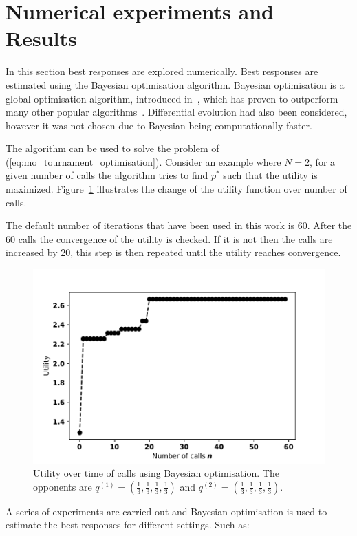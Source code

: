 \documentclass[10pt]{article}
\begin{document}
\section{Numerical experiments and Results} \label{section:numerical_experiments}

In this section best responses are explored numerically. Best responses are
estimated using the Bayesian optimisation algorithm. Bayesian optimisation is a
global optimisation algorithm, introduced in~\cite{Mokus1978}, which has proven
to outperform many other popular algorithms~\cite{Jones2001}. Differential
evolution had also been considered, however it was not chosen due to Bayesian
being computationally faster.

The algorithm can be used to solve the problem of
(\ref{eq:mo_tournament_optimisation}). Consider an example
where \(N=2\), for a given number of calls the algorithm tries to find \(p^*\)
such that the utility is maximized. Figure~\ref{bayesian_example} illustrates
the change of the utility function over number of calls.

The default number of iterations that have been used in this work is 60. After
the 60 calls the convergence of the utility is checked. If it is not then the
calls are increased by 20, this step is then repeated until the utility reaches
convergence.

\begin{figure}[!htbp]
    \begin{center}
    \includegraphics[width=.5\linewidth]{img/bayesian_example.pdf}
    \end{center}
    \caption{Utility over time of calls using Bayesian optimisation. The
    opponents are \(q^{(1)} = (\frac{1}{3}, \frac{1}{3}, \frac{1}{3},
    \frac{1}{3})\) and \(q^{(2)} = (\frac{1}{3}, \frac{1}{3},
    \frac{1}{3}, \frac{1}{3})\).}
    \label{bayesian_example}
\end{figure}

A series of experiments are carried out and Bayesian optimisation is used to
estimate the best responses for different settings. Such as:
\end{document}
